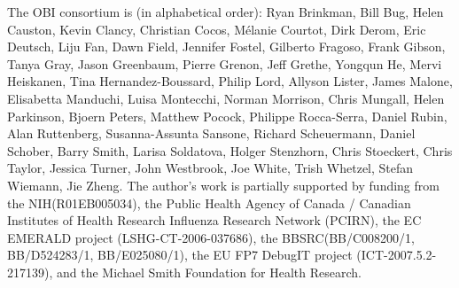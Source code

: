 \documentclass[jou]{ao2e}%
\begin{document}
The OBI consortium is (in alphabetical order): Ryan Brinkman, Bill Bug, Helen Causton, Kevin Clancy, Christian Cocos, M\'elanie Courtot, Dirk Derom, Eric Deutsch, Liju Fan, Dawn Field, Jennifer Fostel, Gilberto Fragoso, Frank Gibson, Tanya Gray, Jason Greenbaum, Pierre Grenon, Jeff Grethe, Yongqun He, Mervi Heiskanen, Tina Hernandez-Boussard, Philip Lord, Allyson Lister, James Malone, Elisabetta Manduchi, Luisa Montecchi, Norman Morrison, Chris Mungall, Helen Parkinson, Bjoern Peters, Matthew Pocock, Philippe Rocca-Serra, Daniel Rubin, Alan Ruttenberg, Susanna-Assunta Sansone, Richard Scheuermann, Daniel Schober, Barry Smith, Larisa Soldatova, Holger Stenzhorn, Chris Stoeckert, Chris Taylor, Jessica Turner, John Westbrook,  Joe White, Trish Whetzel, Stefan Wiemann, Jie Zheng. 
The author's work is partially supported by funding from the NIH(R01EB005034),  the Public Health Agency of Canada / Canadian Institutes of Health Research Influenza Research Network (PCIRN), the EC EMERALD project (LSHG-CT-2006-037686), the BBSRC(BB/C008200/1, BB/D524283/1, BB/E025080/1), the EU FP7 DebugIT project (ICT-2007.5.2-217139), and the Michael Smith Foundation for Health Research.


%
\end{document}

